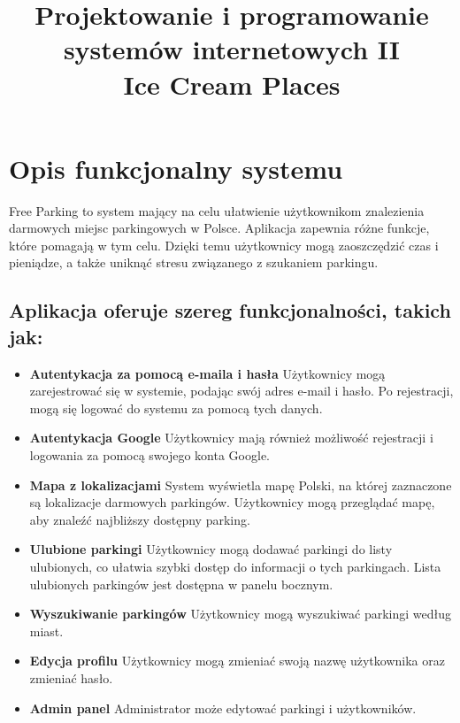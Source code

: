 \documentclass{article}
\title{
	Projektowanie i programowanie systemów internetowych II\\
	\Huge{Ice Cream Places}
}
\date{}
\begin{document}
	\maketitle

	\section {Opis funkcjonalny systemu}
    Free Parking to system mający na celu ułatwienie użytkownikom znalezienia darmowych miejsc parkingowych w Polsce. Aplikacja zapewnia różne funkcje, które pomagają w tym celu. Dzięki temu użytkownicy mogą zaoszczędzić czas i pieniądze, a także uniknąć stresu związanego z szukaniem parkingu.
    
    \subsection{Aplikacja oferuje szereg funkcjonalności, takich jak:}
    \begin{itemize}
        \item \textbf{Autentykacja za pomocą e-maila i hasła} Użytkownicy mogą zarejestrować się w systemie, podając swój adres e-mail i hasło. Po rejestracji, mogą się logować do systemu za pomocą tych danych.
        \item \textbf{Autentykacja Google} Użytkownicy mają również możliwość rejestracji i logowania za pomocą swojego konta Google.
        \item \textbf{Mapa z lokalizacjami} System wyświetla mapę Polski, na której zaznaczone są lokalizacje darmowych parkingów. Użytkownicy mogą przeglądać mapę, aby znaleźć najbliższy dostępny parking.
        \item \textbf{Ulubione parkingi} Użytkownicy mogą dodawać parkingi do listy ulubionych, co ułatwia szybki dostęp do informacji o tych parkingach. Lista ulubionych parkingów jest dostępna w panelu bocznym.
        \item \textbf{Wyszukiwanie parkingów} Użytkownicy mogą wyszukiwać parkingi według miast.
        \item \textbf{Edycja profilu} Użytkownicy mogą zmieniać swoją nazwę użytkownika oraz zmieniać hasło.
        \item \textbf{Admin panel} Administrator może edytować parkingi i użytkowników.
    \end{itemize}
\end{document}

